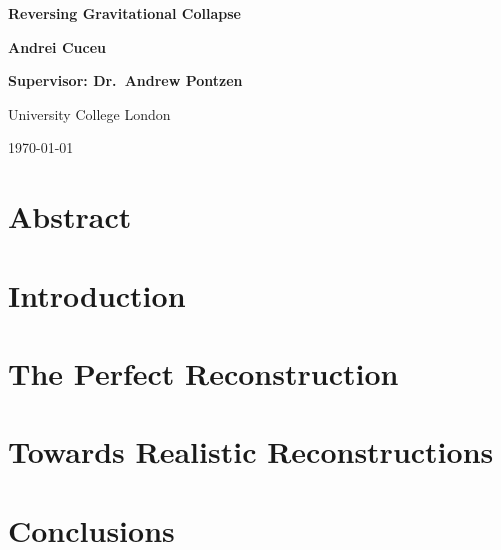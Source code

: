\documentclass[12pt,aas_macros,twoside]{report}
\begin{document}
\begin{titlepage}
    \begin{center}
        
        \vspace*{3cm}
        {\fontsize{40}{60}\selectfont \textbf{Reversing Gravitational Collapse}}
        
        
        \vspace{3cm}
        
        \Huge
        \textbf{Andrei Cuceu}
        
        
        \vspace{1cm}
        
        \huge
        \textbf{Supervisor: Dr.\ Andrew Pontzen}
        
        \vspace{7cm}
        
        \huge
        University College London
        
        \vspace{0.5cm}
        \huge
        \today
        
    \end{center}
\end{titlepage}



\chapter*{\Huge Abstract}

\cite{Eisenstein_BAOpeak_reconstruction}

\tableofcontents

\newpage
\chapter{Introduction}


% 

% 

\newpage
\chapter{The Perfect Reconstruction}


\newpage
\chapter{Towards Realistic Reconstructions}


\newpage
\chapter{Conclusions}


\printbibliography{}
\end{document}
